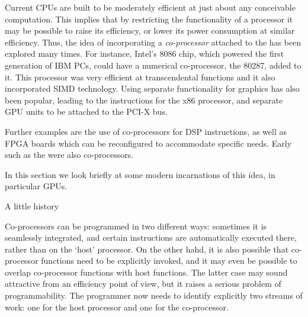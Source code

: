 Current CPUs are built to be moderately efficient at just about any
conceivable computation. This implies that by restricting the
functionality of a processor it may be possible to raise its
efficiency, or lower its power consumption at similar
efficiency. Thus, the idea of incorporating a \emph{co-processor}
attached to the 
has been explored many times. For instance, Intel's 8086 chip, which
powered the first generation of IBM PCs, could have a numerical
co-processor, the 80287, added to it. This processor was very
efficient at transcendental functions and it also incorporated
\ac{SIMD} technology. Using separate functionality for graphics has also
been popular, leading to the  instructions for the x86 processor,
and separate \ac{GPU} units to be attached to the PCI-X bus.

Further examples are the use of co-processors
  for \ac{DSP} instructions, as well as \ac{FPGA} boards which can be
  reconfigured to accommodate specific needs.
Early 
such as the  were also co-processors.

In this section we look briefly at some modern incarnations of this idea,
in particular \acp{GPU}.

 {A little history}

Co-processors can be programmed in two different ways: sometimes 
it is seamlessly integrated, and certain instructions are
automatically executed there, rather than on the `host' processor. On
the other hahd, it is also possible that co-processor functions need
to be explicitly invoked, and it may even be possible to overlap
co-processor functions with host functions. The latter case may sound
attractive from an efficiency point of view, but it raises a serious
problem of programmability. The programmer now needs to identify
explicitly two streams of work: one for the host processor and one for
the co-processor.

